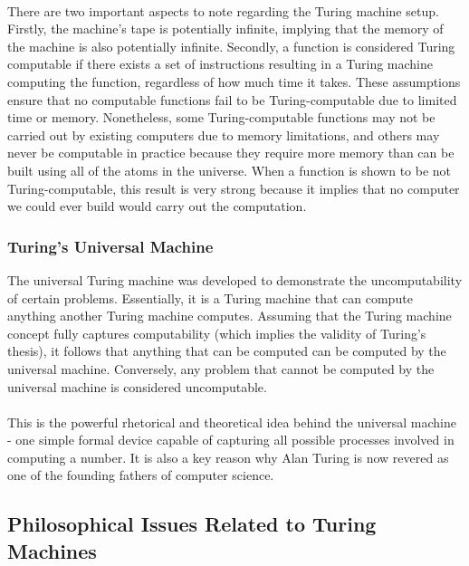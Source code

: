 \documentclass[10pt,a4paper]{article}
\newcounter{theo}
\begin{document}
                \\
                There are two important aspects to note regarding the Turing machine setup. Firstly, the machine's tape is potentially infinite, implying that the memory of the machine is also potentially infinite. Secondly, a function is considered Turing computable if there exists a set of instructions resulting in a Turing machine computing the function, regardless of how much time it takes. These assumptions ensure that no computable functions fail to be Turing-computable due to limited time or memory. Nonetheless, some Turing-computable functions may not be carried out by existing computers due to memory limitations, and others may never be computable in practice because they require more memory than can be built using all of the atoms in the universe. When a function is shown to be not Turing-computable, this result is very strong because it implies that no computer we could ever build would carry out the computation.\cite{sep-turing-machine}
            \subsubsection{Turing's Universal Machine}
                The universal Turing machine was developed to demonstrate the uncomputability of certain problems. Essentially, it is a Turing machine that can compute anything another Turing machine computes. Assuming that the Turing machine concept fully captures computability (which implies the validity of Turing's thesis), it follows that anything that can be computed can be computed by the universal machine. Conversely, any problem that cannot be computed by the universal machine is considered uncomputable.
                \\
                \\
                This is the powerful rhetorical and theoretical idea behind the universal machine - one simple formal device capable of capturing all possible processes involved in computing a number. It is also a key reason why Alan Turing is now revered as one of the founding fathers of computer science.\cite{sep-turing-machine}
            \subsection{Philosophical Issues Related to Turing Machines}             
\end{document}

